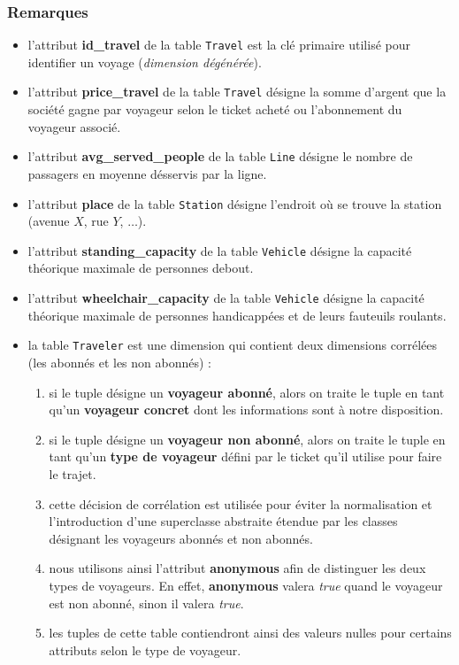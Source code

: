 \documentclass[a4paper,12pt]{report}
\begin{document}
\subsubsection{Remarques}
\begin{itemize}
  \item l'attribut \textbf{id\_travel} de la table \texttt{Travel} est la clé primaire utilisé pour identifier un voyage (\textit{dimension dégénérée}).
  \item l'attribut \textbf{price\_travel} de la table \texttt{Travel} désigne la somme d'argent que la société gagne par voyageur selon le ticket acheté ou l'abonnement du voyageur associé.
  \item l'attribut \textbf{avg\_served\_people} de la table \texttt{Line} désigne le nombre de passagers en moyenne désservis par la ligne.
  \item l'attribut \textbf{place} de la table \texttt{Station} désigne l'endroit où se trouve la station (avenue $X$, rue $Y$, $\dots$).
  \item l'attribut \textbf{standing\_capacity} de la table \texttt{Vehicle} désigne la capacité théorique maximale de personnes debout.
  \item l'attribut \textbf{wheelchair\_capacity} de la table \texttt{Vehicle} désigne la capacité théorique maximale de personnes handicappées et de leurs fauteuils roulants.
  \item la table \texttt{Traveler} est une dimension qui contient deux dimensions corrélées (les abonnés et les non abonnés) :
  \begin{enumerate}
    \item si le tuple désigne un \textbf{voyageur abonné}, alors on traite le tuple en tant qu'un \textbf{voyageur concret} dont les informations sont à notre disposition.
    \item si le tuple désigne un \textbf{voyageur non abonné}, alors on traite le tuple en tant qu'un \textbf{type de voyageur} défini par le ticket qu'il utilise pour faire le trajet.
    \item cette décision de corrélation est utilisée pour éviter la normalisation et l'introduction d'une superclasse abstraite étendue par les classes désignant les voyageurs abonnés et non abonnés.
    \item nous utilisons ainsi l'attribut \textbf{anonymous} afin de distinguer les deux types de voyageurs. En effet, \textbf{anonymous} valera \textit{true} quand le voyageur est non abonné, sinon il valera \textit{true}.
    \item les tuples de cette table contiendront ainsi des valeurs nulles pour certains attributs selon le type de voyageur.
  \end{enumerate}
\end{itemize}
\end{document}
